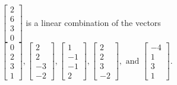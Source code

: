 \begin{exercise}
\begin{exerciseStatement}
  \end{exerciseStatement}
  \begin{exerciseAnswer}
   \(\left[\begin{array}{c}
2 \\
6 \\
3 \\
0
\end{array}\right]\) 
  	 is  
	a linear combination of the vectors \(\left[\begin{array}{c}
0 \\
2 \\
3 \\
1
\end{array}\right] , \left[\begin{array}{c}
2 \\
2 \\
-3 \\
-2
\end{array}\right] , \left[\begin{array}{c}
1 \\
-1 \\
-1 \\
2
\end{array}\right] , \left[\begin{array}{c}
2 \\
2 \\
3 \\
-2
\end{array}\right] , \text{ and } \left[\begin{array}{c}
-4 \\
1 \\
3 \\
1
\end{array}\right]\).

	
  


  \end{exerciseAnswer}
\end{exercise}
